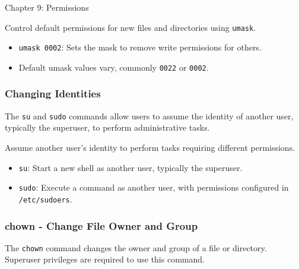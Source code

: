 \begin{notes}{Chapter 9: Permissions}
    \begin{highlight}
    
    Control default permissions for new files and directories using \texttt{umask}.
    
    \begin{itemize}
        \item \texttt{umask 0002}: Sets the mask to remove write permissions for others.
        \item Default umask values vary, commonly \texttt{0022} or \texttt{0002}.
    \end{itemize}
    
    \end{highlight}
    
    \subsubsection*{Changing Identities}
    
    The \texttt{su} and \texttt{sudo} commands allow users to assume the identity of another user, typically the superuser, to perform administrative tasks.
    
    \begin{highlight}
    
    Assume another user's identity to perform tasks requiring different permissions.
    
    \begin{itemize}
        \item \texttt{su}: Start a new shell as another user, typically the superuser.
        \item \texttt{sudo}: Execute a command as another user, with permissions configured in \texttt{/etc/sudoers}.
    \end{itemize}
    
    \end{highlight}
    
    \subsubsection*{chown - Change File Owner and Group}
    
    The \texttt{chown} command changes the owner and group of a file or directory. Superuser privileges are required to use this command.
    
    \begin{highlight}
    

\end{highlight}
\end{notes}
